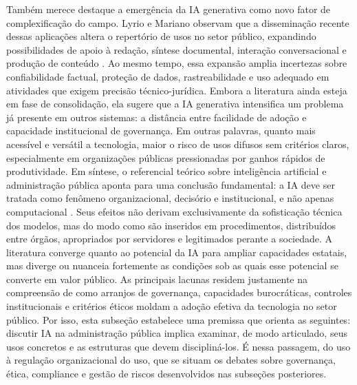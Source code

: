\documentclass[12pt,a4paper]{article}
\begin{document}
Também merece destaque a emergência da IA generativa como novo fator de complexificação do campo. Lyrio e Mariano observam que a disseminação recente dessas aplicações altera o repertório de usos no setor público, expandindo possibilidades de apoio à redação, síntese documental, interação conversacional e produção de conteúdo \autocite{lyrio2025emerging} \autocite{mariano2026inteligencia}. Ao mesmo tempo, essa expansão amplia incertezas sobre confiabilidade factual, proteção de dados, rastreabilidade e uso adequado em atividades que exigem precisão técnico-jurídica. Embora a literatura ainda esteja em fase de consolidação, ela sugere que a IA generativa intensifica um problema já presente em outros sistemas: a distância entre facilidade de adoção e capacidade institucional de governança. Em outras palavras, quanto mais acessível e versátil a tecnologia, maior o risco de usos difusos sem critérios claros, especialmente em organizações públicas pressionadas por ganhos rápidos de produtividade.
Em síntese, o referencial teórico sobre inteligência artificial e administração pública aponta para uma conclusão fundamental: a IA deve ser tratada como fenômeno organizacional, decisório e institucional, e não apenas computacional \autocite{madan2022ai} \autocite{criado2024artificial} \autocite{serra2024a}. Seus efeitos não derivam exclusivamente da sofisticação técnica dos modelos, mas do modo como são inseridos em procedimentos, distribuídos entre órgãos, apropriados por servidores e legitimados perante a sociedade. A literatura converge quanto ao potencial da IA para ampliar capacidades estatais, mas diverge ou nuanceia fortemente as condições sob as quais esse potencial se converte em valor público. As principais lacunas residem justamente na compreensão de como arranjos de governança, capacidades burocráticas, controles institucionais e critérios éticos moldam a adoção efetiva da tecnologia no setor público. Por isso, esta subseção estabelece uma premissa que orienta as seguintes: discutir IA na administração pública implica examinar, de modo articulado, seus usos concretos e as estruturas que devem discipliná-los. É nessa passagem, do uso à regulação organizacional do uso, que se situam os debates sobre governança, ética, compliance e gestão de riscos desenvolvidos nas subseções posteriores.
\end{document}
